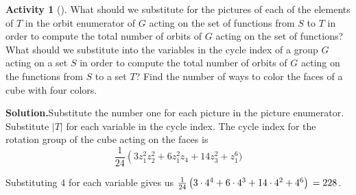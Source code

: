\documentclass[10pt,]{book}
\theoremstyle{plain}
\theoremstyle{definition}
\newtheorem{activity}[project]{Activity}
\numberwithin{equation}{chapter}
\begin{document}
\begin{activity}[]\label{activity-315}
What should we substitute for the pictures of each of the elements of \(T\) in the orbit enumerator of \(G\) acting on the set of functions from \(S\) to \(T\) in order to compute the total number of orbits of \(G\) acting on the set of functions? What should we substitute into the variables in the cycle index of a group \(G\) acting on a set \(S\) in order to compute the total number of orbits of \(G\) acting on the functions from \(S\) to a set \(T\)? Find the number of ways to color the faces of a cube with four colors.%
\par\medskip\noindent%
\textbf{Solution.}\quad Substitute the number one for each picture in the picture enumerator. Substitute \(|T|\) for each variable in the cycle index. The cycle index for the rotation group of the cube acting on the faces is%
\begin{equation*}
\frac{1}{24}\left(3z_1^2z_2^2+ 6z_1^2z_4 +14z_3^2+z_1^6\right.)
\end{equation*}
%
\par
Substituting 4 for each variable gives us \(\frac{1}{24}\left(3\cdot4^4+6\cdot4^3+14\cdot 4^2+4^6\right)\\=228\).%
\end{activity}
\end{document}
